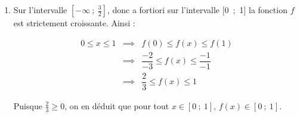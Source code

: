 \begin{enumerate}
\begin{center}
\end{center}

\item Sur l'intervalle $[- \infty~;~\frac32]$, donc a fortiori sur l'intervalle [0~;~1] la fonction $f$ est strictement croissante. Ainsi :

\[\begin{array}{rcl}
0 \leqslant x \leqslant 1 &\implies& f(0) \leqslant f(x) \leqslant f(1) \\
&\implies& \dfrac{-2}{-3} \leqslant f(x) \leqslant \dfrac{-1}{-1} \\
&\implies& \dfrac{2}{3} \leqslant f(x) \leqslant 1
\end{array}\]

Puisque $\frac{2}{3} \geqslant 0$, on en déduit que pour tout $x \in [0~;~1]$,\: $f(x) \in [0~;~1]$.
\end{enumerate}

\medskip

